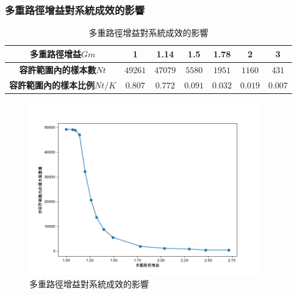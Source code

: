     \subsubsection{多重路徑增益對系統成效的影響}
    \label{chp:multipath_bandwidth}



    \begin{table}[htpb]
        \begin{center}
          \caption{多重路徑增益對系統成效的影響}
          \label{tab:multipath_effect}
          \begin{tabular}{|c||c|c|c|c|c|c|} %
            \hline  
           \textbf{多重路徑增益$Gm$} &
           1&
           1.14&
           1.5&
           1.78&
           2&
           3
           \\\hline\hline

           \textbf{容許範圍內的樣本數$Nt$} &
           $49261$&
           $47079$&
           $5580$&
           $1951$&
           $1160$&
           $431$
           \\\hline

           \textbf{容許範圍內的樣本比例$Nt/K$} &
           $0.807$&
           $0.772$&
           $0.091$&
           $0.032$&
           $0.019$&
           $0.007$
           \\\hline
         \end{tabular}
       \end{center}
     \end{table}

     \begin{figure}[htpb]
        \centering
        \includegraphics[width=10cm]{ch4pic/multipath_effect.png}
        \caption{多重路徑增益對系統成效的影響}
        \label{pic:multipath_effect}
    \end{figure}



